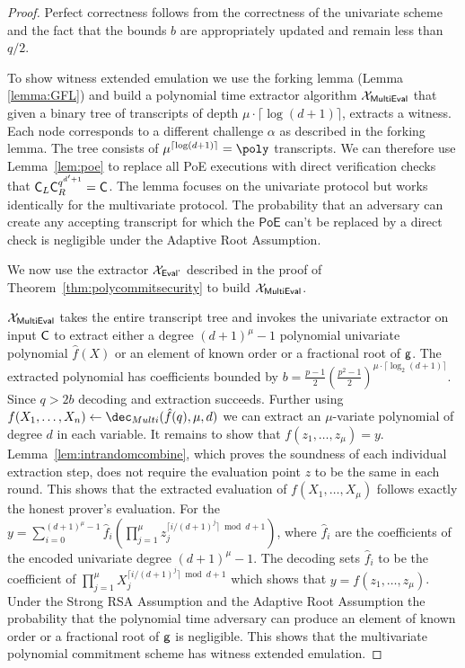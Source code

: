 \begin{proof}
	Perfect correctness follows from the correctness of the univariate scheme and the fact that the bounds $b$ are appropriately updated and remain less than $q/2$.
	
	To show witness extended emulation we use the forking lemma (Lemma \ref{lemma:GFL}) and build a polynomial time extractor algorithm $\mathcal{X}_{\textsf{{MultiEval}}}$ that given a binary tree of transcripts of depth $\mu \cdot\lceil\log(d+1)\rceil$, extracts a witness. Each node corresponds to a different challenge $\alpha$ as described in the forking lemma. The tree consists of $\mu^{\lceil\log(d+1)\rceil}=\poly$ transcripts. 
We can therefore use Lemma~\ref{lem:poe} to replace all \textsf{PoE} executions with direct verification checks that $\mathsf{C}_L\mathsf{C}_R^{q^{d'+1}}=\mathsf{C}$. The lemma focuses on the univariate  protocol but works identically for the multivariate protocol. The probability that an adversary can create any accepting transcript for which the $\textsf{PoE}$ can't be replaced by a direct check is negligible under the Adaptive Root Assumption.

	We now use the extractor $\mathcal{X}_{\textsf{{Eval'}}}$ described in the proof of Theorem~\ref{thm:polycommitsecurity} to build $\mathcal{X}_{\textsf{{MultiEval}}}$. 
	
	$\mathcal{X}_{\textsf{{MultiEval}}}$ takes the entire transcript tree and invokes the univariate extractor on input $\mathsf{C}$ to extract either a degree $(d+1)^\mu-1$ polynomial univariate polynomial $\hat{f}(X)$ or an element of known order or a fractional root of $\mathsf{g}$. The extracted polynomial has coefficients bounded by $b=\frac{p-1}{2}(\frac{p^2-1}{2})^{\mu
	\cdot \lceil\log_2(d+1)\rceil}$. Since $q>2b$ decoding and extraction succeeds. Further using $f(X_1,\dots,X_n)\gets\dec_{Multi}(\hat{f}(q),\mu,d)$ we can extract an $\mu$-variate polynomial of degree $d$ in each variable. 
It remains to show that $f(z_1,\dots,z_\mu)=y$. Lemma~\ref{lem:intrandomcombine}, which proves the soundness of each individual extraction step, does not require the evaluation point $z$ to be the same in each round. This shows that the extracted evaluation of $f(X_1,\dots,X_\mu)$ follows exactly the honest prover's evaluation.
For the $y=\sum_{i=0}^{(d+1)^\mu-1 } \hat{f}_{i} (\prod_{j=1}^\mu  z_j^{\lceil i/(d+1)^j\rceil \bmod d+1 }) $, where $\hat{f}_i$ are the coefficients of the encoded univariate degree $(d+1)^\mu-1$. The decoding sets $\hat{f}_i$ to be the coefficient of $\prod_{j=1}^\mu  X_j^{\lceil i/(d+1)^j\rceil \bmod d+1 }$ which shows that $y=f(z_1,\dots,z_\mu)$.
Under the Strong RSA Assumption and the Adaptive Root Assumption the probability that the polynomial time adversary can produce an element of known order or a  fractional root of $\mathsf{g}$ is negligible. This shows that the multivariate polynomial commitment scheme has witness extended emulation.
\end{proof}
